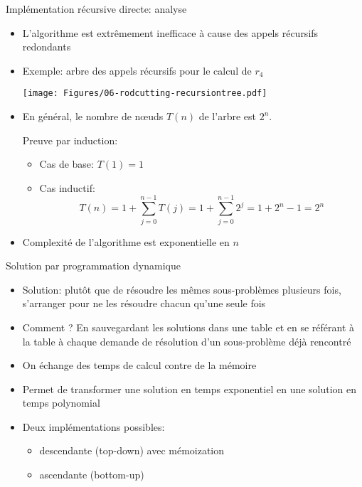 \begin{frame}{Implémentation récursive directe: analyse}

\begin{itemize}
\item L'algorithme est extrêmement inefficace à cause des appels récursifs redondants
\item Exemple: arbre des appels récursifs pour le calcul de $r_4$

\centerline{\texttt{[image: Figures/06-rodcutting-recursiontree.pdf]}}

\item En général, le nombre de n\oe uds $T(n)$ de l'arbre est $2^n$.\\
{\small Preuve par induction:
\begin{itemize}
\item Cas de base: $T(1)=1$
\item Cas inductif: $$T(n)=1+\sum_{j=0}^{n-1} T(j)=1+\sum_{j=0}^{n-1} 2^j=1+2^n-1=2^n$$
\end{itemize}}
\item Complexité de l'algorithme est exponentielle en $n$
\end{itemize}
\end{frame}

\begin{frame}{Solution par programmation dynamique}

\begin{itemize}
\item Solution: plutôt que de résoudre les mêmes sous-problèmes plusieurs fois,
  s'arranger pour ne les résoudre chacun qu'une seule fois
\item Comment ? En sauvegardant les solutions dans une table et en se
  référant à la table à chaque demande de résolution d'un
  sous-problème déjà rencontré
\item On échange des temps de calcul contre de la mémoire
\item Permet de transformer une solution en temps exponentiel en une solution en temps polynomial
\item Deux implémentations possibles:
\begin{itemize}
\item descendante (top-down) avec \alert{mémoization}
\item ascendante (bottom-up)
\end{itemize}

\end{itemize}

\end{frame}

